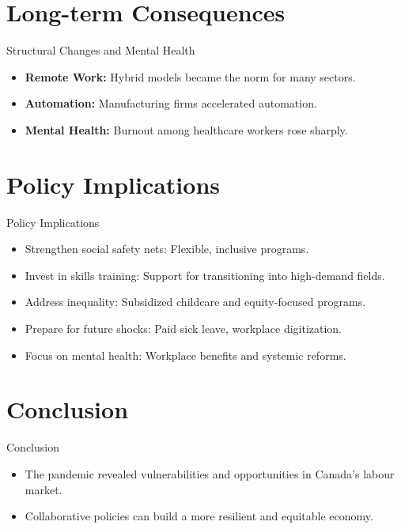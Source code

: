 \documentclass{beamer}
\begin{document}
\section{Long-term Consequences}
\begin{frame}{Structural Changes and Mental Health}
    \begin{itemize}
        \item \textbf{Remote Work:} Hybrid models became the norm for many sectors.
        \item \textbf{Automation:} Manufacturing firms accelerated automation.
        \item \textbf{Mental Health:} Burnout among healthcare workers rose sharply.
    \end{itemize}
\end{frame}

\section{Policy Implications}
\begin{frame}{Policy Implications}
    \begin{itemize}
        \item Strengthen social safety nets: Flexible, inclusive programs.
        \item Invest in skills training: Support for transitioning into high-demand fields.
        \item Address inequality: Subsidized childcare and equity-focused programs.
        \item Prepare for future shocks: Paid sick leave, workplace digitization.
        \item Focus on mental health: Workplace benefits and systemic reforms.
    \end{itemize}
\end{frame}

\section{Conclusion}
\begin{frame}{Conclusion}
    \begin{itemize}
        \item The pandemic revealed vulnerabilities and opportunities in Canada's labour market.
        \item Collaborative policies can build a more resilient and equitable economy.
    \end{itemize}
 
\end{frame}
\end{document}
